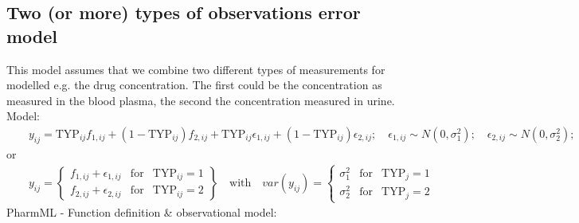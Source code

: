 \documentclass[a4paper,10pt]{article}
\begin{document}
\subsection{Two (or more) types of observations error model}
\label{model9}
This model assumes that we combine two different types of measurements for modelled e.g. the drug concentration. The first could be the concentration as measured in the blood plasma, the second the concentration measured in urine.
Model:
\begin{eqnarray}
&& y_{ij} = \text{TYP}_{ij} f_{1,ij} + (1-\text{TYP}_{ij}) f_{2,ij} + \text{TYP}_{ij}\epsilon_{1,ij} + (1-\text{TYP}_{ij}) \epsilon_{2,ij}; \quad \epsilon_{1,ij} \sim N(0,\sigma_1^2); \quad \epsilon_{2,ij} \sim N(0,\sigma_2^2);\nonumber
\end{eqnarray}
or
\begin{eqnarray}
&& y_{ij} = \left\{ \begin{array}{rcl}  f_{1,ij} + \epsilon_{1,ij}  & \mbox{for} & \text{TYP}_{ij}  = 1 \\
f_{2,ij} + \epsilon_{2,ij}  & \mbox{for} & \text{TYP}_{ij}  = 2 \nonumber
\end{array}\right\} \quad \text{with} \quad
\mathit{var}(y_{ij}) = \left\{ \begin{array}{rcl}  \sigma_{1}^2  & \mbox{for} & \text{TYP}_j  = 1 \\
\sigma_{2}^2  & \mbox{for} & \text{TYP}_j  = 2 \nonumber
\end{array}\right.
\end{eqnarray}
PharmML - Function definition \& observational model:
\end{document}
